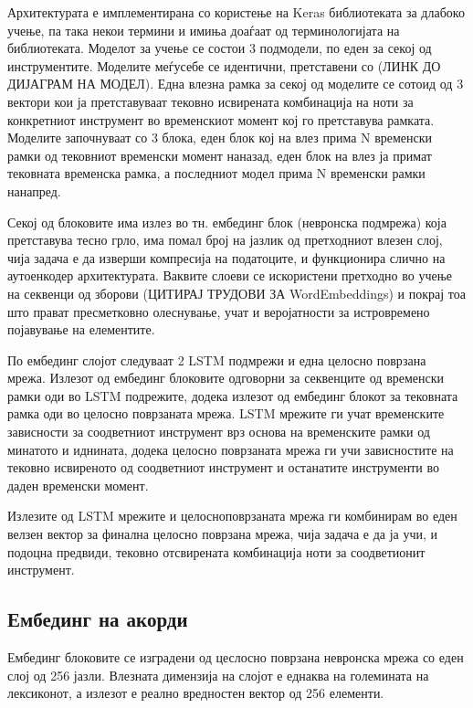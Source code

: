 Архитектурата е имплементирана со користење на Keras библиотеката за длабоко учење, па така некои термини и имиња доаѓаат од терминологијата на библиотеката.
Моделот за учење се состои 3 подмодели, по еден за секој од инструментите. Моделите меѓусебе се идентични, претставени со (ЛИНК ДО ДИЈАГРАМ НА МОДЕЛ). Една влезна рамка за секој од моделите се сотоид од 3 вектори кои ја претставуваат тековно исвирената комбинација на ноти за конкретниот инструмент во временскиот момент кој го претставува рамката. Моделите започнуваат со 3 блока, еден блок кој на влез прима N временски рамки од тековниот временски момент наназад, еден блок на влез ја примат тековната временска рамка, а последниот модел прима N временски рамки нанапред.

Секој од блоковите има излез во тн. ембединг блок (невронска подмрежа) која претставува тесно грло, има помал број на јазлик од претходниот влезен слој, чија задача е да изверши компресија на податоците, и функционира слично на аутоенкодер архитектурата. Ваквите слоеви се искористени претходно во учење на секвенци од зборови (ЦИТИРАЈ ТРУДОВИ ЗА WordEmbeddings) и покрај тоа што прават пресметковно олеснување, учат и веројатности за истровремено појавување на елементите.

По ембединг слојот следуваат 2 LSTM подмрежи и една целосно поврзана мрежа. Излезот од ембединг блоковите одговорни за секвенците од временски рамки оди во LSTM подрежите, додека излезот од ембединг блокот за тековната рамка оди во целосно поврзаната мрежа. LSTM мрежите ги учат временските зависности за соодветниот инструмент врз основа на временските рамки од минатото и иднината, додека целосно поврзаната мрежа ги учи зависностите на тековно исвиреното од соодветниот инструмент и останатите инструменти во даден временски момент. 

Излезите од LSTM мрежите и целосноповрзаната мрежа ги комбинирам во еден велзен вектор за финална целосно поврзана мрежа, чија задача е да ја учи, и подоцна предвиди, тековно отсвирената комбинација ноти за соодветионит инструмент.

\subsection{Ембединг на акорди}

Ембединг блоковите се изградени од цеслосно поврзана невронска мрежа со еден слој од 256 јазли. Влезната димензија на слојот е еднаква на големината на лексиконот, а излезот е реално вредностен вектор од 256 елементи.

